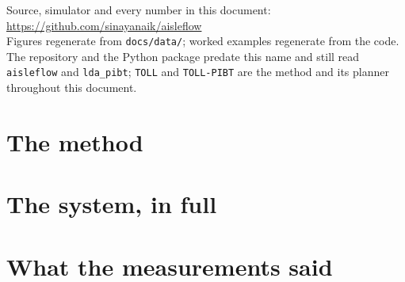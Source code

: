 \documentclass[11pt,a4paper]{article}
\begin{document}
\vfill

\begin{center}
\small
Source, simulator and every number in this document:
\url{https://github.com/sinayanaik/aisleflow}\\
Figures regenerate from \texttt{docs/data/}; worked examples regenerate from the code.\\[0.4em]
\footnotesize
The repository and the Python package predate this name and still read
\texttt{aisleflow} and \texttt{lda\_pibt}; \texttt{TOLL} and
\texttt{TOLL-PIBT} are the method and its planner throughout this document.
\end{center}

\clearpage
\tableofcontents
\clearpage

\part{The method}





\part{The system, in full}



















\part{What the measurements said}



\clearpage


\end{document}
